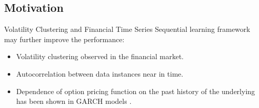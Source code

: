 \documentclass[10pt,table,mathserif]{beamer}
\begin{document}
\subsection{Motivation}
\begin{frame}{Volatility Clustering and Financial Time Series}
Sequential learning framework may further improve the performance:
\begin{itemize}
  \item Volatility clustering observed in the financial market.
  \item Autocorrelation between data instances near in time.
  \item Dependence of option pricing function on the past history of the underlying has been shown in GARCH models \footnotemark.
\end{itemize}
\end{frame}
\end{document}

